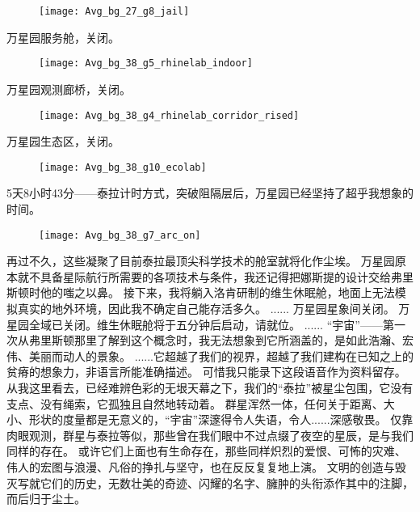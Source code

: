 \documentclass[openany]{book}
\begin{document}
\begin{figure}[h]
    \centering
    \texttt{[image: Avg\_bg\_27\_g8\_jail]}
\end{figure}
\begin{dialogue}
     万星园服务舱，关闭。
    \begin{figure}[h]
        \centering
        \texttt{[image: Avg\_bg\_38\_g5\_rhinelab\_indoor]}
    \end{figure}
     万星园观测廊桥，关闭。
    \begin{figure}[h]
        \centering
        \texttt{[image: Avg\_bg\_38\_g4\_rhinelab\_corridor\_rised]}
    \end{figure}
     万星园生态区，关闭。
    \begin{figure}[h]
        \centering
        \texttt{[image: Avg\_bg\_38\_g10\_ecolab]}
    \end{figure}
     5天8小时43分——泰拉计时方式，突破阻隔层后，万星园已经坚持了超乎我想象的时间。
    \begin{figure}[h]
        \centering
        \texttt{[image: Avg\_bg\_38\_g7\_arc\_on]}
    \end{figure}
     再过不久，这些凝聚了目前泰拉最顶尖科学技术的舱室就将化作尘埃。
     万星园原本就不具备星际航行所需要的各项技术与条件，我还记得把娜斯提的设计交给弗里斯顿时他的嗤之以鼻。
     接下来，我将躺入洛肯研制的维生休眠舱，地面上无法模拟真实的地外环境，因此我不确定自己能存活多久。
     ......
     万星园星象间关闭。
     万星园全域已关闭。维生休眠舱将于五分钟后启动，请就位。
     ......
     “宇宙”——第一次从弗里斯顿那里了解到这个概念时，我无法想象到它所涵盖的，是如此浩瀚、宏伟、美丽而动人的景象。
     ......它超越了我们的视界，超越了我们建构在已知之上的贫瘠的想象力，非语言所能准确描述。
     可惜我只能录下这段语音作为资料留存。
     从我这里看去，已经难辨色彩的无垠天幕之下，我们的“泰拉”被星尘包围，它没有支点、没有绳索，它孤独且自然地转动着。
     群星浑然一体，任何关于距离、大小、形状的度量都是无意义的，“宇宙”深邃得令人失语，令人......深感敬畏。
     仅靠肉眼观测，群星与泰拉等似，那些曾在我们眼中不过点缀了夜空的星辰，是与我们同样的存在。
     或许它们上面也有生命存在，那些同样炽烈的爱恨、可怖的灾难、伟人的宏图与浪漫、凡俗的挣扎与坚守，也在反反复复地上演。
     文明的创造与毁灭写就它们的历史，无数壮美的奇迹、闪耀的名字、臃肿的头衔添作其中的注脚，而后归于尘土。

\end{dialogue}
\end{document}
